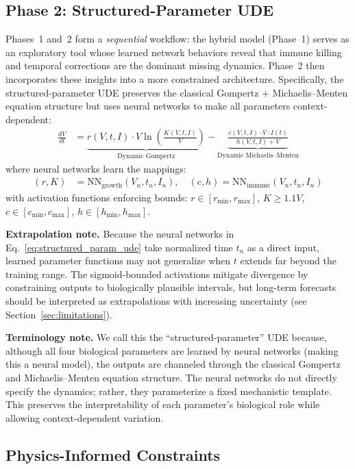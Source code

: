\documentclass{juliacon}
\begin{document}
\subsection{Phase 2: Structured-Parameter UDE}

Phases~1 and~2 form a \emph{sequential} workflow: the hybrid model (Phase~1) serves as an exploratory tool whose learned network behaviors reveal that immune killing and temporal corrections are the dominant missing dynamics. Phase~2 then incorporates these insights into a more constrained architecture. Specifically, the structured-parameter UDE preserves the classical Gompertz + Michaelis--Menten equation structure but uses neural networks to make all parameters context-dependent:
\begin{align}
\frac{dV}{dt} &= \underbrace{r(V,t,I) \cdot V \ln\left(\frac{K(V,t,I)}{V}\right)}_{\text{Dynamic Gompertz}} - \underbrace{\frac{c(V,t,I) \cdot V \cdot I(t)}{h(V,t,I) + V}}_{\text{Dynamic Michaelis--Menten}}
\label{eq:structured_param_ude}
\end{align}
where neural networks learn the mappings:
\begin{align}
(r, K) &= \text{NN}_{\text{growth}}(V_n, t_n, I_n), \quad
(c, h) = \text{NN}_{\text{immune}}(V_n, t_n, I_n)
\end{align}
with activation functions enforcing bounds: $r \in [r_{\min}, r_{\max}]$, $K \geq 1.1V$, $c \in [c_{\min}, c_{\max}]$, $h \in [h_{\min}, h_{\max}]$.

\textbf{Extrapolation note.} Because the neural networks in Eq.~\ref{eq:structured_param_ude} take normalized time $t_n$ as a direct input, learned parameter functions may not generalize when $t$ extends far beyond the training range. The sigmoid-bounded activations mitigate divergence by constraining outputs to biologically plausible intervals, but long-term forecasts should be interpreted as extrapolations with increasing uncertainty (see Section~\ref{sec:limitations}).

\textbf{Terminology note.} We call this the ``structured-parameter'' UDE because, although all four biological parameters are learned by neural networks (making this a neural model), the outputs are channeled through the classical Gompertz and Michaelis--Menten equation structure. The neural networks do not directly specify the dynamics; rather, they parameterize a fixed mechanistic template. This preserves the interpretability of each parameter's biological role while allowing context-dependent variation.

\subsection{Physics-Informed Constraints}
\end{document}

